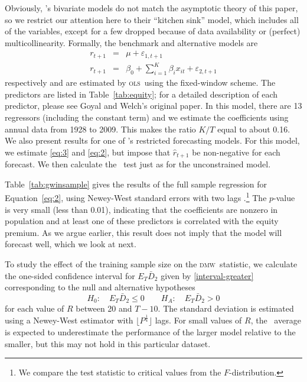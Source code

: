 \documentclass[11pt]{article}
\newcommand{\citepos}[1]{\citeauthor{#1}'s \citeyearpar{#1}}
\newcommand{\dmw}{\textsc{dmw}}
\newcommand{\ols}{\textsc{ols}}
\begin{document}
Obviously, \citepos{goyal-welch-2008-rfs} bivariate models do not
match the asymptotic theory of this paper, so we restrict our
attention here to their ``kitchen sink'' model, which includes all of
the variables, except for a few dropped because of data availability or
(perfect) multicollinearity.  Formally, the benchmark and alternative models are
\begin{eqnarray}
  \label{eq:3}
  r_{t+1} &=& \mu + \varepsilon_{1,t+1} \\
  \label{eq:2}
r_{t+1} &=& \beta_0 + \sum_{i=1}^K \beta_{i} x_{it} + \varepsilon_{2,t+1}  
\end{eqnarray}
respectively and are estimated by \ols\ using the fixed-window scheme.
The predictors are listed in Table~\ref{tab:equity}; for a detailed
description of each predictor, please see Goyal and Welch's original
paper.  In this model, there are 13 regressors (including the constant
term) and we estimate the coefficients using annual data from 1928 to
2009.  This makes the ratio $K/T$ equal to about 0.16.  We also
present results for one of \citepos{campbell-thompson-2008-rfs}
restricted forecasting models.  For this model, we estimate
\eqref{eq:3} and \eqref{eq:2}, but impose that $\hat r_{t+1}$ be
non-negative for each forecast.  We then calculate the \oos\ test just
as for the unconstrained model.

Table~\ref{tab:gwinsample} gives the results of the full sample
regression for Equation~\eqref{eq:2}, using Newey-West standard errors
with two lags \citep{newey_simple_1987}.\footnote{We compare the test
  statistic to critical values from the $F$-distribution.}  The
$p$-value is very small (less than 0.01), indicating that the
coefficients are nonzero in population and at least one of these
predictors is correlated with the equity premium.  As we argue
earlier, this result does not imply that the model will forecast well,
which we look at next.

To study the effect of the training sample size on the \dmw\ statistic, we
calculate the one-sided confidence interval for $E_T \bar D_2$ given
by \eqref{interval-greater} corresponding to the null and alternative
hypotheses
\[ H_0: \quad E_T \bar D_2 \leq 0 \qquad
H_A: \quad E_T \bar D_2 > 0
\]
for each value of $R$ between 20 and $T-10$.  The standard deviation
is estimated using a Newey-West estimator with $\lfloor
P^{\frac14}\rfloor$ lags.  For small values of $R$, the \oos\ average
is expected to underestimate the performance of the larger model
relative to the smaller, but this may not hold in this particular
dataset.
\end{document}
